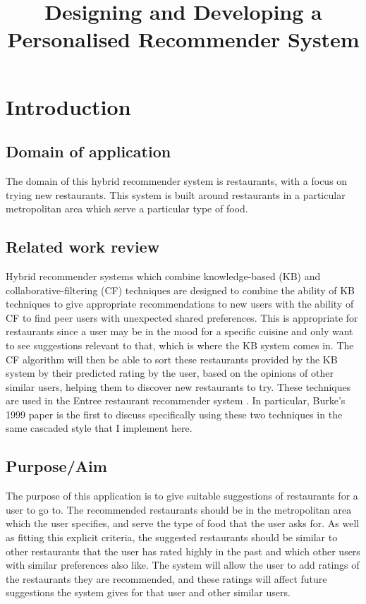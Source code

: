 \documentclass[conference]{IEEEtran}
\begin{document}
\title{Designing and Developing a Personalised Recommender System}

\author{
}

\maketitle


\section{Introduction}

\subsection{Domain of application}
The domain of this hybrid recommender system is restaurants, with a focus on trying new restaurants. 
This system is built around restaurants in a particular metropolitan area which serve a particular 
type of food. 

\subsection{Related work review}
Hybrid recommender systems which combine knowledge-based (KB) and collaborative-filtering (CF) techniques 
are designed to combine the ability of KB techniques to give appropriate recommendations to new users with 
the ability of CF to find peer users with unexpected shared preferences. 
This is appropriate for restaurants since a user may be in the mood for a specific cuisine and only want to see 
suggestions relevant to that, which is where the KB system comes in. 
The CF algorithm will then be able to sort these restaurants provided by the KB system by their predicted 
rating by the user, based on the opinions of other similar users, helping them to discover new restaurants to try. 
These techniques are used in the Entree restaurant recommender system \cite{burke1999integrating,burke2000knowledge,burke2002hybrid,burke2007hybrid}. 
In particular, Burke's 1999 paper \cite{burke1999integrating} is the first to discuss specifically using these 
two techniques in the same cascaded style that I implement here. 

\subsection{Purpose/Aim}
The purpose of this application is to give suitable suggestions of restaurants for a user to go to. 
The recommended restaurants should be in the metropolitan area which the user specifies, and serve the 
type of food that the user asks for. 
As well as fitting this explicit criteria, the suggested restaurants should be similar to other restaurants 
that the user has rated highly in the past and which other users with similar preferences also like. 
The system will allow the user to add ratings of the restaurants they are recommended, and these ratings will 
affect future suggestions the system gives for that user and other similar users. 
\end{document}
